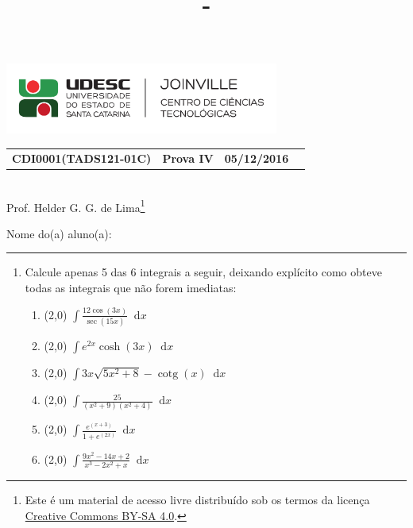 \documentclass[12pt,a4paper]{article}
\author{\eu}
\title{\prova - \disciplina}
\date{\data}
\newcommand*\diff{\mathop{}\!\mathrm{d}}
\newcommand*\cotg{\operatorname{cotg}}
\newcommand*\prova{Prova IV}
\newcommand*\turma{TADS121-01C}
\newcommand*\disciplina{CDI0001}
\newcommand*\eu{Helder G. G. de Lima}
\newcommand*\data{05/12/2016}
\begin{document}
\thispagestyle{empty}
\begin{center}
\includegraphics[width=9.0cm]{marca}
\noindent\begin{tabular}{l c c r}
  \textbf{\disciplina (\turma)}
& \textbf{\prova}
& \textbf{\data}
\end{tabular}
\\ Prof. \eu\footnote{
Este é um material de acesso livre distribuído sob os termos da licença \href{https://creativecommons.org/licenses/by-sa/4.0/deed.pt_BR}{Creative Commons BY-SA 4.0}.}
\end{center}

\noindent Nome do(a) aluno(a): \rule{13cm}{0.01cm}

\begin{center}
\end{center}



\begin{enumerate}
\item Calcule apenas 5 das 6 integrais a seguir, deixando explícito como obteve todas as integrais que não forem imediatas:
\begin{enumerate}
\item (2,0) $\displaystyle \int \frac{12 \cos(3x)}{\sec(15x)} \diff x$
\item (2,0) $\displaystyle \int e^{2x} \cosh(3x) \diff x$
\item (2,0) $\displaystyle \int 3x \sqrt{5x^2+8} -\cotg(x) \diff x$
\item (2,0) $\displaystyle \int \frac{25}{(x^2+9)(x^2+4)} \diff x$
\item (2,0) $\displaystyle \int \frac{e^{(x+3)}}{1+e^{(2x)}} \diff x$
\item (2,0) $\displaystyle \int \frac{9 x^2 - 14 x + 2}{x^3-2x^2+x} \diff x$
\end{enumerate}
\end{enumerate}
\end{document}
